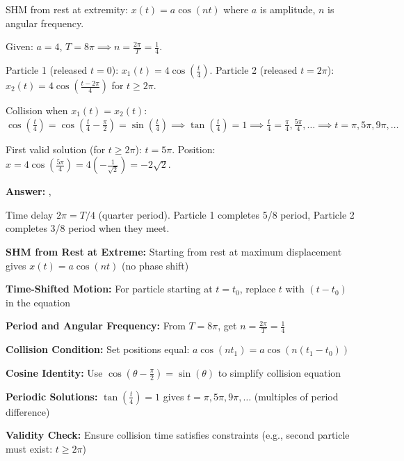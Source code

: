 \begin{solution}
SHM from rest at extremity: $x(t) = a\cos(nt)$ where $a$ is amplitude, $n$ is angular frequency.

Given: $a=4$, $T=8\pi \implies n = \frac{2\pi}{T} = \frac{1}{4}$.

Particle 1 (released $t=0$): $x_1(t) = 4\cos\left(\frac{t}{4}\right)$. Particle 2 (released $t=2\pi$): $x_2(t) = 4\cos\left(\frac{t-2\pi}{4}\right)$ for $t \geq 2\pi$.

Collision when $x_1(t)=x_2(t)$: $\cos\left(\frac{t}{4}\right) = \cos\left(\frac{t}{4}-\frac{\pi}{2}\right) = \sin\left(\frac{t}{4}\right) \implies \tan\left(\frac{t}{4}\right) = 1 \implies \frac{t}{4} = \frac{\pi}{4}, \frac{5\pi}{4}, \ldots \implies t = \pi, 5\pi, 9\pi, \ldots$

First valid solution (for $t \geq 2\pi$): $t=5\pi$. Position: $x = 4\cos\left(\frac{5\pi}{4}\right) = 4\left(-\frac{1}{\sqrt{2}}\right) = -2\sqrt{2}$.

\textbf{Answer:} , 

Time delay $2\pi = T/4$ (quarter period). Particle 1 completes 5/8 period, Particle 2 completes 3/8 period when they meet.
\end{solution}

\begin{takeaways}
\item \textbf{SHM from Rest at Extreme:} Starting from rest at maximum displacement gives $x(t) = a\cos(nt)$ (no phase shift)
\item \textbf{Time-Shifted Motion:} For particle starting at $t = t_0$, replace $t$ with $(t-t_0)$ in the equation
\item \textbf{Period and Angular Frequency:} From $T = 8\pi$, get $n = \frac{2\pi}{T} = \frac{1}{4}$
\item \textbf{Collision Condition:} Set positions equal: $a\cos(nt_1) = a\cos(n(t_1-t_0))$
\item \textbf{Cosine Identity:} Use $\cos(\theta - \frac{\pi}{2}) = \sin(\theta)$ to simplify collision equation
\item \textbf{Periodic Solutions:} $\tan(\frac{t}{4}) = 1$ gives $t = \pi, 5\pi, 9\pi, \ldots$ (multiples of period difference)
\item \textbf{Validity Check:} Ensure collision time satisfies constraints (e.g., second particle must exist: $t \geq 2\pi$)
\end{takeaways}

